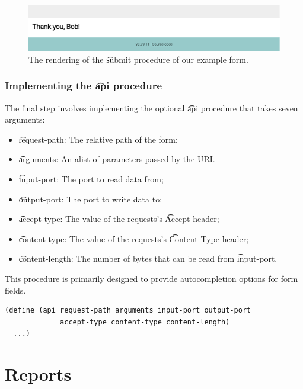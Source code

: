   \begin{figure}[H]
    \begin{center}
      \includegraphics[width=1.0\textwidth]{figures/sg-web-form-example-submit.pdf}
    \end{center}
    \caption{The rendering of the \t{submit} procedure of our example form.}
    \label{fig:web-form-submit}
  \end{figure}


\subsubsection{Implementing the \t{api} procedure}

  The final step involves implementing the optional \t{api} procedure
  that takes seven arguments:
  \begin{itemize}
  \item \t{request-path}:   The relative path of the form;
  \item \t{arguments}:      An alist of parameters passed by the URI.
  \item \t{input-port}:     The port to read data from;
  \item \t{output-port}:    The port to write data to;
  \item \t{accept-type}:    The value of the requests's \t{Accept} header;
  \item \t{content-type}:   The value of the requests's \t{Content-Type} header;
  \item \t{content-length}: The number of bytes that can be read from
    \t{input-port}.
  \end{itemize}

  This procedure is primarily designed to provide autocompletion options
  for form fields.

\begin{siderules}
\begin{verbatim}
(define (api request-path arguments input-port output-port
             accept-type content-type content-length)
  ...)
\end{verbatim}
\end{siderules}

\pagebreak{}
\section{Reports}
\label{sec:reports}

